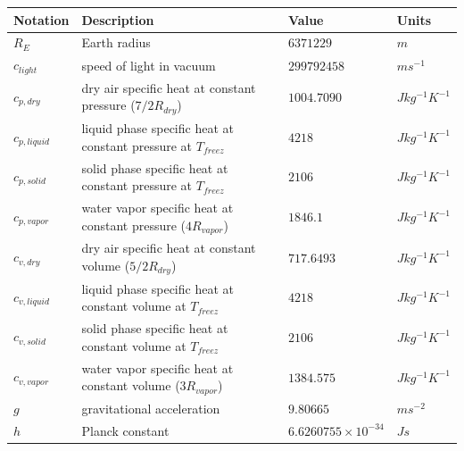 \documentclass[letterpaper,titlepage,10pt]{article}
\numberwithin{equation}{section}
\begin{document}
\begin{appendices}
\begin{tabular}{p{}p{}p{}p{}}
	\hline
	\textbf{Notation}  & \textbf{Description}                                                                 & \textbf{Value}             & \textbf{Units} \\
	\hline
	$R_E$              & Earth radius                                                                         & $6371229$                  & $m$ \\
	$c_{light}$        & speed of light in vacuum                                                             & $299792458$                & $m s^{-1}$ \\
	$c_{p,dry}$        & dry air specific heat at constant pressure ($7 / 2 R_{dry}$)                         & $1004.7090$                & $J kg^{-1} K^{-1}$ \\
	$c_{p,liquid}$     & liquid phase specific heat at constant pressure at $T_{freez}$                       & $4218$                     & $J kg^{-1} K^{-1}$ \\
	$c_{p,solid}$      & solid phase specific heat at constant pressure at $T_{freez}$                        & $2106$                     & $J kg^{-1} K^{-1}$ \\
	$c_{p,vapor}$      & water vapor specific heat at constant pressure ($4 R_{vapor}$)                       & $1846.1$                   & $J kg^{-1} K^{-1}$ \\
	$c_{v,dry}$        & dry air specific heat at constant volume ($5 / 2 R_{dry}$)                           & $717.6493$                 & $J kg^{-1} K^{-1}$ \\
	$c_{v,liquid}$     & liquid phase specific heat at constant volume at $T_{freez}$                         & $4218$                     & $J kg^{-1} K^{-1}$ \\
	$c_{v,solid}$      & solid phase specific heat at constant volume at $T_{freez}$                          & $2106$                     & $J kg^{-1} K^{-1}$ \\
	$c_{v,vapor}$      & water vapor specific heat at constant volume ($3 R_{vapor}$)                         & $1384.575$                 & $J kg^{-1} K^{-1}$ \\
	$g$                & gravitational acceleration                                                           & $9.80665$                  & $m s^{-2}$ \\
	$h$                & Planck constant                                                                      & $6.6260755 \times 10^{-34}$& $J s$ \\

\end{tabular}
\end{appendices}
\end{document}
